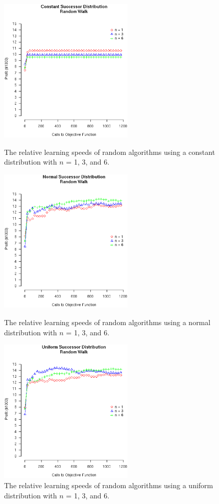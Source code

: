 \documentclass[12pt]{article}
\begin{document}
\begin{figure}[!ht]
  \begin{minipage}[b]{0.5\linewidth}
    \center
    \includegraphics[width=6.4cm]{RanCONSTANTDist.eps}
    \caption{The relative learning speeds of random algorithms using a constant
      distribution with $n$ = 1, 3, and 6.}
  \end{minipage}
\hspace{0.5cm} %
  \begin{minipage}[b]{0.5\linewidth}
    \center
    \includegraphics[width=6.4cm]{RanNORMALDist.eps}
    \caption{The relative learning speeds of random algorithms using a normal
      distribution with $n$ = 1, 3, and 6.}
  \end{minipage}
  \begin{minipage}[b]{0.5\linewidth}
    \center
    \includegraphics[width=6.4cm]{RanUNIFORMDist.eps}
    \caption{The relative learning speeds of random algorithms using a uniform
      distribution with $n$ = 1, 3, and 6.}
  \end{minipage}
\end{figure}
\end{document}
